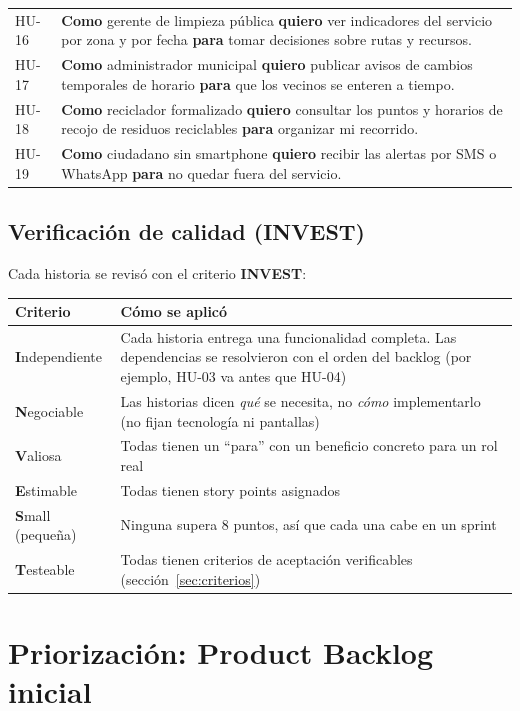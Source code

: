 \documentclass[11pt,a4paper]{article}
\newcommand{\hu}[3]{\textbf{Como} #1 \textbf{quiero} #2 \textbf{para} #3}
\begin{document}
{\begin{longtable}{C{1.3cm} L{14.3cm}}
HU-16 & \hu{gerente de limpieza pública}{ver indicadores del servicio por zona y por fecha}{tomar decisiones sobre rutas y recursos.} \\
HU-17 & \hu{administrador municipal}{publicar avisos de cambios temporales de horario}{que los vecinos se enteren a tiempo.} \\
HU-18 & \hu{reciclador formalizado}{consultar los puntos y horarios de recojo de residuos reciclables}{organizar mi recorrido.} \\
HU-19 & \hu{ciudadano sin smartphone}{recibir las alertas por SMS o WhatsApp}{no quedar fuera del servicio.} \\
\bottomrule
\end{longtable}
}

\subsection{Verificación de calidad (INVEST)}

Cada historia se revisó con el criterio \textbf{INVEST}:

{\small
\begin{longtable}{L{3.2cm} L{12.4cm}}
\toprule
\textbf{Criterio} & \textbf{Cómo se aplicó} \\
\midrule
\endhead
\textbf{I}ndependiente & Cada historia entrega una funcionalidad completa. Las dependencias se resolvieron con el orden del backlog (por ejemplo, HU-03 va antes que HU-04) \\
\textbf{N}egociable & Las historias dicen \textit{qué} se necesita, no \textit{cómo} implementarlo (no fijan tecnología ni pantallas) \\
\textbf{V}aliosa & Todas tienen un ``para'' con un beneficio concreto para un rol real \\
\textbf{E}stimable & Todas tienen story points asignados \\
\textbf{S}mall (pequeña) & Ninguna supera 8 puntos, así que cada una cabe en un sprint \\
\textbf{T}esteable & Todas tienen criterios de aceptación verificables (sección~\ref{sec:criterios}) \\
\bottomrule
\end{longtable}
}

\section{Priorización: Product Backlog inicial}
\end{document}
